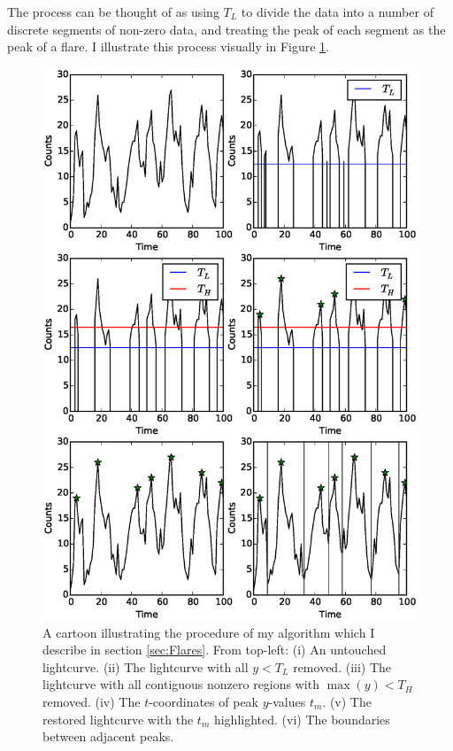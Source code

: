 The process can be thought of as using $T_L$ to divide the data into a number of discrete segments of non-zero data, and treating the peak of each segment as the peak of a flare.  I illustrate this process visually in Figure \ref{fig:BurstAlg}.

\begin{figure}
    \includegraphics[width=\columnwidth, trim = 0mm 30mm 0mm 28mm]{images/steps.eps}
    \captionsetup{singlelinecheck=off}
    \caption[A cartoon illustrating the procedure of the algorithm described in Section \ref{sec:Flares}.]{A cartoon illustrating the procedure of my algorithm which I describe in section \ref{sec:Flares}.  From top-left: (i) An untouched lightcurve.  (ii) The lightcurve with all $y<T_L$ removed.  (iii) The lightcurve with all contiguous nonzero regions with $\max(y)<T_H$ removed.  (iv) The $t$-coordinates of peak $y$-values $t_m$.  (v) The restored lightcurve with the $t_m$ highlighted.  (vi) The boundaries between adjacent peaks.}
   \label{fig:BurstAlg}
\end{figure}

